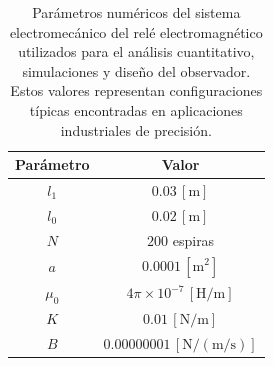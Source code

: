 \documentclass[
  11pt,
  letterpaper,
   addpoints,
  ]{exam}
\begin{document}
\begin{table}[h!]
  \centering
  \caption{Parámetros numéricos del sistema electromecánico del relé electromagnético utilizados para el análisis cuantitativo, simulaciones y diseño del observador. Estos valores representan configuraciones típicas encontradas en aplicaciones industriales de precisión.}
  \label{tab:parametros-numericos}
  \begin{tabular}{@{}c c@{}}
    \toprule
    \textbf{Parámetro} & \textbf{Valor} \\
    \midrule
    $l_1$ & $0.03\,[\mathrm{m}]$ \\
    $l_0$ & $0.02\,[\mathrm{m}]$ \\
    $N$   & $200$ espiras \\
    $a$   & $0.0001\,[\mathrm{m}^2]$ \\
    $\mu_0$ & $4\pi \times 10^{-7}\,[\mathrm{H/m}]$ \\
    $K$   & $0.01\,[\mathrm{N/m}]$ \\
    $B$   & $0.00000001\,[\mathrm{N/(m/s)}]$ \\
    \bottomrule
  \end{tabular}
\end{table}
\end{document}
